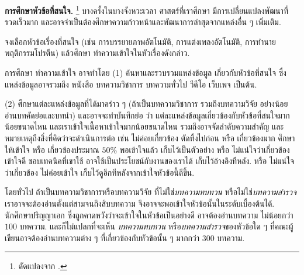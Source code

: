 \begin{Exercise}
	\label{ex: prep reading}

\textbf{การศึกษาหัวข้อที่สนใจ.}%
\footnote{%
ดัดแปลงจาก \cite{Alake2020}.
}
บางครั้งในบางจังหวะเวลา
ศาสตร์ที่เราศึกษา
มีการเปลี่ยนแปลงพัฒนาที่รวดเร็วมาก
และอาจจำเป็นต้องศึกษาความก้าวหน้าและพัฒนาการล่าสุดจากแหล่งอื่น ๆ เพิ่มเติม.

จงเลือกหัวข้อเรื่องที่สนใจ
(เช่น 
การบรรยายภาพอัตโนมัติ,
การแต่งเพลงอัตโนมัติ,
การทำนายพฤติกรรมโปรตีน)
แล้วศึกษา ทำความเข้าใจในหัวเรื่องดังกล่าว.

การศึกษา ทำความเข้าใจ
อาจทำโดย
(1) ค้นหาและรวบรวมแหล่งข้อมูล
เกี่ยวกับหัวข้อที่สนใจ
ซึ่งแหล่งข้อมูลอาจรวมถึง
หนังสือ บทความวิชาการ
บทความทั่วไป วีดีโอ เว็บเพจ เป็นต้น.

(2) ศึกษาแต่ละแหล่งข้อมูลที่ได้มาคร่าว ๆ
(ถ้าเป็นบทความวิชาการ รวมถึงบทความวิจัย อย่างน้อย อ่านบทคัดย่อและบทนำ) 
และอาจจะทำบันทึกย่อ 
ว่า
แต่ละแหล่งข้อมูลเกี่ยวข้องกับหัวข้อที่สนใจมากน้อยขนาดไหน
และเราเข้าใจเนื้อหาเข้าใจมากน้อยขนาดไหน
รวมถึงอาจจัดลำดับความสำคัญ
และหมายเหตุถึงสิ่งที่คิดว่าจะดำเนินการต่อ
เช่น
ไม่ค่อยเกี่ยวข้อง ตัดทิ้งไปก่อน 
หรือ เกี่ยวข้องมาก ศึกษาให้เข้าใจ
หรือ เกี่ยวข้องประมาณ $50\%$ พอเข้าใจแล้ว
เก็บไว้เป็นตัวอย่าง
หรือ ไม่แน่ใจว่าเกี่ยวข้อง เข้าใจดี
ชอบเทคนิคที่เขาใช้ อาจใช้เป็นประโยชน์กับงานของเราได้ เก็บไว้อ้างอิงทีหลัง.
หรือ ไม่แน่ใจว่าเกี่ยวข้อง ไม่ค่อยเข้าใจ
เก็บไว้ดูอีกทีหลังจากเข้าใจหัวข้อนี้ดีขึ้น.

โดยทั่วไป ถ้าเป็นบทความวิชาการหรือบทความวิจัย ที่ไม่ใช่\textit{บทความทบทวน} หรือไม่ใช่\textit{บทความสำรวจ}
เราอาจจะต้องอ่านตั้งแต่สามจนถึงสิบบทความ จึงอาจจะพอเข้าใจหัวข้อนั้นในระดับเบื้องต้นได้.
นักศึกษาปริญญาเอก ซึ่งถูกคาดหวังว่าจะเข้าใจในหัวข้อเป็นอย่างดี
อาจต้องอ่านบทความ ไม่น้อยกว่า $100$ บทความ.
และก็ไม่แปลกที่จะเห็น
\textit{บทความทบทวน} หรือ\textit{บทความสำรวจ}ของหัวข้อใด ๆ 
ที่คณะผู้เขียนอาจต้องอ่านบทความต่าง ๆ ที่เกี่ยวข้องกับหัวข้อนั้น ๆ มากกว่า $300$ บทความ.



\end{Exercise}
